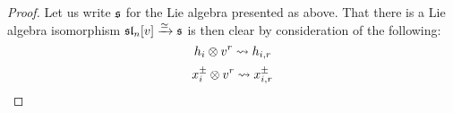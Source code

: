                 \begin{proof}
                    Let us write $\mathfrak{s}$ for the Lie algebra presented as above. That there is a Lie algebra isomorphism $\mathfrak{sl}_n[v] \xrightarrow[]{\simeq} \mathfrak{s}$ is then clear by consideration of the following:
                        $$h_i \tensor v^r \mapsto h_{i, r}$$
                        $$x_i^{\pm} \tensor v^r \mapsto x_{i, r}^{\pm}$$
                \end{proof}
            \begin{lemma} \label{lemma: universal_central_extensions_of_lie_algebras_over_associative_algebras}
                
            \end{lemma}